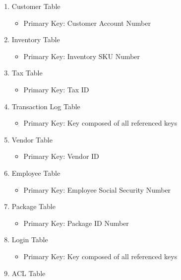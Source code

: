 \documentclass{report}
\begin{document}



    \begin{enumerate}
        \item{Customer Table}
        \begin{itemize}
            \item{Primary Key: Customer Account Number}
        \end{itemize}
        \item{Inventory Table}
        \begin{itemize}
            \item{Primary Key: Inventory SKU Number}
        \end{itemize}
        \item{Tax Table}
        \begin{itemize}
            \item{Primary Key: Tax ID}
        \end{itemize}
        \item{Transaction Log Table}
        \begin{itemize}
            \item{Primary Key: Key composed of all referenced keys}
        \end{itemize}
        \item{Vendor Table}
        \begin{itemize}
            \item{Primary Key: Vendor ID}
        \end{itemize}
        \item{Employee Table}
        \begin{itemize}
            \item{Primary Key: Employee Social Security Number}
        \end{itemize}
        \item{Package Table}
        \begin{itemize}
            \item{Primary Key: Package ID Number}
        \end{itemize}
        \item{Login Table}
        \begin{itemize}
            \item{Primary Key: Key composed of all referenced keys}
        \end{itemize}
        \item{ACL Table}
        \begin{itemize}

\end{itemize}
\end{enumerate}
\end{document}
